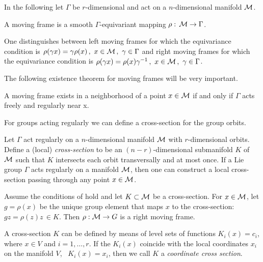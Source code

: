 In the following let $\Gamma$ be $r$-dimensional and act on a $n$-dimensional manifold $\mathcal{M}$.
\begin{definition}
 A moving frame is a smooth $\Gamma$-equivariant mapping $\rho:\,\mathcal{M} \rightarrow \Gamma$.
\end{definition}
One distinguishes between left moving frames for which the equivariance condition is $\rho(\gamma x)=\gamma\rho(x)\,,\ x\in\mathcal{M}\,,\ \gamma\in\Gamma$ and right moving frames for which the equivariance condition is $\rho(\gamma x)=\rho(x)\gamma^{-1}\,,\ x\in\Manif\,,\ \gamma\in\Gamma$.

The following existence theorem for moving frames will be very important.

\begin{theorem}
 A moving frame exists in a neighborhood of a point $x\in \mathcal{M}$ if and
 only if $\Gamma$ acts freely and regularly near x.
\end{theorem}


For groups acting regularly we can define a cross-section for the group orbits.


\begin{proposition}%
 \label{pro:crossExists}
 Let $\Gamma$ act regularly on a $n$-dimensional manifold $\mathcal{M}$ with $r$-dimensional orbits.
 Define a (local) \emph{cross-section}
 to be an $(n-r)$-dimensional submanifold $K$ of $\mathcal{M}$ such that $K$ intersects each orbit transversally and at most once. If a Lie group $\Gamma$ acts regularly on a manifold $\mathcal{M}$, then one can construct a local cross-section passing through any point $x\in \mathcal{M}$.
\end{proposition}



\begin{theorem}
 Assume the conditions of  hold and let $K\subset\mathcal{M}$ be a cross-section.
 For $x\in \mathcal{M}$, let $g=\rho(x)$ be the unique group element that maps $x$ to the
 cross-section: $g z = \rho(z) z\, \in K$. Then $\rho:\mathcal{M}\rightarrow G$ is a right moving frame.
\end{theorem}

A cross-section $K$ can be defined by means of level sets of functions $K_i(x)=c_i$,
where $x\in V$ and $i=1,\ldots,r$. If the $K_i(x)$
coincide with the local coordinates $x_i$ on the manifold $V$, \ie~$K_i(x)=x_i$,
then we call $K$ a \emph{coordinate cross section}.

